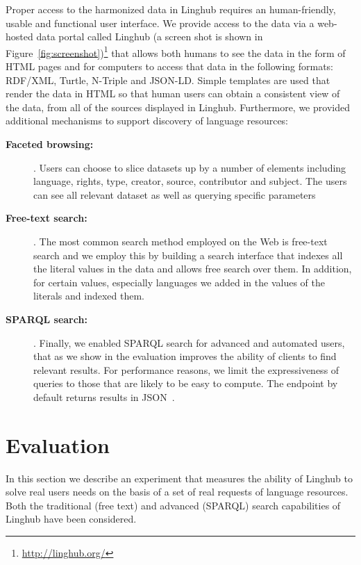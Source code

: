 \documentclass[smallextended]{svjour3}       %
\begin{document}
Proper access to the harmonized data in Linghub requires an human-friendly, usable and functional user interface.
We provide access to the data via a web-hosted data portal called Linghub (a screen shot is shown in
Figure~\ref{fig:screenshot})\footnote{\url{http://linghub.org/}}
that allows both humans to see the data in the form of HTML
pages and for computers to access that data in the following formats: RDF/XML,
Turtle, N-Triple and JSON-LD\@. Simple templates are used that render the data in
HTML so that human users can obtain a consistent view of the data, from all of
the sources displayed in Linghub. Furthermore, we provided additional
mechanisms to support discovery of language resources:

\begin{description}
    \item[\textbf{Faceted browsing:}]. Users can choose to slice datasets up by a number of
        elements including language, rights, type, creator, source, contributor
        and subject. The users can see all relevant dataset as well as querying
        specific parameters
    \item[\textbf{Free-text search:}]. The most common search method employed on the Web is
        free-text search and we employ this by building a search interface that 
        indexes all the literal values in the data and allows free search over
        them. In addition, for certain values, especially languages we added in
        the values of the literals and indexed them.
    \item[\textbf{SPARQL search:}]. Finally, we enabled SPARQL search for advanced and
        automated users, that as we show in the evaluation improves the ability
        of clients to find relevant results. For performance reasons, we limit
        the expressiveness of queries to those that are likely to be easy to
        compute. The endpoint by default returns results in
        JSON~\cite{seaborne2013sparql}.
\end{description}

\section{Evaluation}
\label{evaluation}

In this section we describe an experiment that measures the ability of Linghub to solve real users needs on the basis of a set of real requests of language resources. 
Both the traditional (free text) and advanced (SPARQL) search capabilities of Linghub have been considered.
\end{document}
